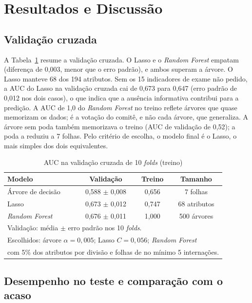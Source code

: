 \documentclass[conference]{IEEEtran}
\begin{document}
\section{Resultados e Discussão}

\subsection{Validação cruzada}

A Tabela~\ref{tab:cv} resume a validação cruzada. O Lasso e o \textit{Random Forest} empatam (diferença de 0,003, menor que o erro padrão), e ambos superam a árvore. O Lasso manteve 68 dos 194 atributos. Sem os 15 indicadores de exame não pedido, a AUC do Lasso na validação cruzada cai de 0,673 para 0,647 (erro padrão de 0,012 nos dois casos), o que indica que a ausência informativa contribui para a predição. A AUC de 1,0 do \textit{Random Forest} no treino reflete árvores que quase memorizam os dados; é a votação do comitê, e não cada árvore, que generaliza. A árvore sem poda também memorizava o treino (AUC de validação de 0,52); a poda a reduziu a 7 folhas. Pelo critério de escolha, o modelo final é o Lasso, o mais simples dos dois equivalentes.

\begin{table}[htbp]
\caption{AUC na validação cruzada de 10 \textit{folds} (treino)}
\label{tab:cv}
\centering
\small
\begin{tabular}{lccc}
\toprule
\textbf{Modelo} & \textbf{Validação} & \textbf{Treino} & \textbf{Tamanho} \\
\midrule
Árvore de decisão & 0,588 $\pm$ 0,008 & 0,656 & 7 folhas \\
Lasso & 0,673 $\pm$ 0,012 & 0,747 & 68 atributos \\
\textit{Random Forest} & 0,676 $\pm$ 0,011 & 1,000 & 500 árvores \\
\bottomrule
\multicolumn{4}{l}{\footnotesize Validação: média $\pm$ erro padrão nos 10 \textit{folds}.} \\
\multicolumn{4}{l}{\footnotesize Escolhidos: árvore $\alpha = 0{,}005$; Lasso $C = 0{,}056$; \textit{Random Forest}} \\
\multicolumn{4}{l}{\footnotesize com 5\% dos atributos por divisão e folhas de no mínimo 5 internações.}
\end{tabular}
\end{table}

\subsection{Desempenho no teste e comparação com o acaso}
\end{document}
